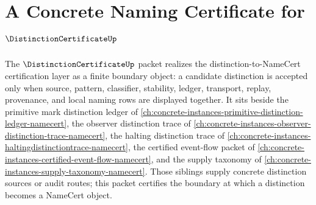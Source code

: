 \chapter{A Concrete Naming Certificate for $\DistinctionCertificateUp$}
\label{ch:concrete-instances-distinction-certificate-namecert}

The $\DistinctionCertificateUp$ packet realizes the distinction-to-NameCert certification layer as a finite boundary object: a candidate distinction is accepted only when source, pattern, classifier, stability, ledger, transport, replay, provenance, and local naming rows are displayed together. It sits beside the primitive mark distinction ledger of \autoref{ch:concrete-instances-primitive-distinction-ledger-namecert}, the observer distinction trace of \autoref{ch:concrete-instances-observer-distinction-trace-namecert}, the halting distinction trace of \autoref{ch:concrete-instances-haltingdistinctiontrace-namecert}, the certified event-flow packet of \autoref{ch:concrete-instances-certified-event-flow-namecert}, and the supply taxonomy of \autoref{ch:concrete-instances-supply-taxonomy-namecert}. Those siblings supply concrete distinction sources or audit routes; this packet certifies the boundary at which a distinction becomes a NameCert object.

